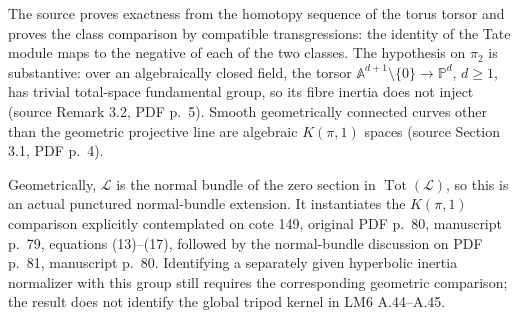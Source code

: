 \documentclass[11pt,a4paper]{article}
\begin{document}
The source proves exactness from the homotopy sequence of the torus
torsor and proves the class comparison by compatible transgressions:
the identity of the Tate module maps to the negative of each of the
two classes. The hypothesis on $\pi_2$ is substantive: over an
algebraically closed field, the torsor
$\mathbb A^{d+1}\setminus\{0\}\to\mathbb P^d$, $d\ge1$, has trivial
total-space fundamental group, so its fibre inertia does not inject
(source Remark 3.2, PDF p.~5). Smooth geometrically connected curves
other than the geometric projective line are algebraic $K(\pi,1)$
spaces (source Section 3.1, PDF p.~4).

Geometrically, $\mathcal L$ is the normal bundle of the zero section in
$\operatorname{Tot}(\mathcal L)$, so this is an actual punctured
normal-bundle extension. It instantiates the $K(\pi,1)$ comparison
explicitly contemplated on cote 149, original PDF p.~80, manuscript
p.~79, equations (13)--(17), followed by the normal-bundle discussion
on PDF p.~81, manuscript p.~80. Identifying a separately given
hyperbolic inertia normalizer with this group still requires the
corresponding geometric comparison; the result does not identify
the global tripod kernel in LM6 A.44--A.45.
\end{document}
